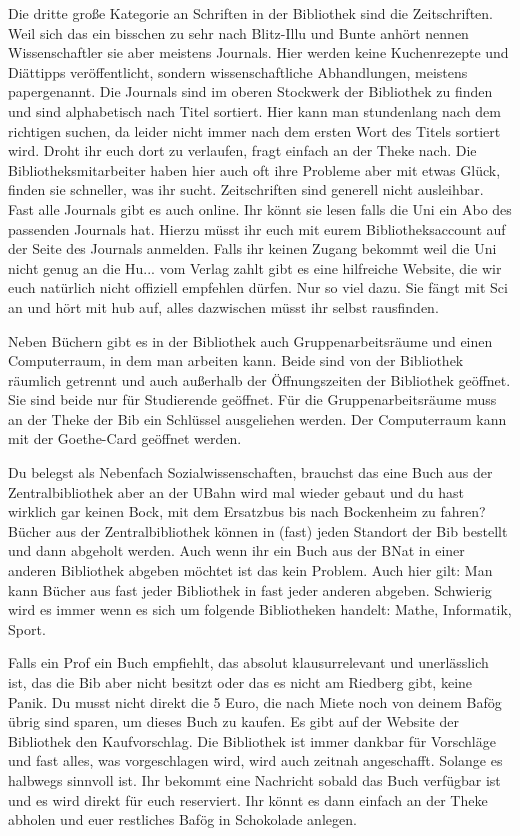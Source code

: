 Die dritte große Kategorie an Schriften in der Bibliothek sind die Zeitschriften. Weil sich das ein bisschen zu sehr nach Blitz-Illu und Bunte anhört nennen Wissenschaftler sie aber meistens Journals. Hier werden keine Kuchenrezepte und Diättipps veröffentlicht, sondern wissenschaftliche Abhandlungen, meistens \glqq paper\grqq genannt. Die Journals sind im oberen Stockwerk der Bibliothek zu finden und sind alphabetisch nach Titel sortiert. Hier kann man stundenlang nach dem richtigen suchen, da leider nicht immer nach dem ersten Wort des Titels sortiert wird. Droht ihr euch dort zu verlaufen, fragt einfach an der Theke nach. Die Bibliotheksmitarbeiter haben hier auch oft ihre Probleme aber mit etwas Glück, finden sie schneller, was ihr sucht. 
Zeitschriften sind generell nicht ausleihbar. Fast alle Journals gibt es auch online. Ihr könnt sie lesen falls die Uni ein Abo des passenden Journals hat. Hierzu müsst ihr euch mit eurem Bibliotheksaccount auf der Seite des Journals anmelden. Falls ihr keinen Zugang bekommt weil die Uni nicht genug an die Hu... vom Verlag zahlt gibt es eine hilfreiche Website, die wir euch natürlich nicht offiziell empfehlen dürfen. Nur so viel dazu. Sie fängt mit Sci an und hört mit hub auf, alles dazwischen müsst ihr selbst rausfinden.

Neben Büchern gibt es in der Bibliothek auch Gruppenarbeitsräume und einen Computerraum, in dem man arbeiten kann. Beide sind von der Bibliothek räumlich getrennt und auch außerhalb der Öffnungszeiten der Bibliothek geöffnet. Sie sind beide nur für Studierende geöffnet. Für die Gruppenarbeitsräume muss an der Theke der Bib ein Schlüssel ausgeliehen werden. Der Computerraum kann mit der Goethe-Card geöffnet werden.

Du belegst als Nebenfach Sozialwissenschaften, brauchst das eine Buch aus der Zentralbibliothek aber an der UBahn wird mal wieder gebaut und du hast wirklich gar keinen Bock, mit dem Ersatzbus bis nach Bockenheim zu fahren? Bücher aus der Zentralbibliothek können in (fast) jeden Standort der Bib bestellt und dann abgeholt werden. Auch wenn ihr ein Buch aus der BNat in einer anderen Bibliothek abgeben möchtet ist das kein Problem. Auch hier gilt: Man kann Bücher aus fast jeder Bibliothek in fast jeder anderen abgeben. Schwierig wird es immer wenn es sich um folgende Bibliotheken handelt: Mathe, Informatik, Sport.

Falls ein Prof ein Buch empfiehlt, das absolut klausurrelevant und unerlässlich ist, das die Bib aber nicht besitzt oder das es nicht am Riedberg gibt, keine Panik. Du musst nicht direkt die 5 Euro, die nach Miete noch von deinem Bafög übrig sind sparen, um dieses Buch zu kaufen. Es gibt auf der Website der Bibliothek den Kaufvorschlag. Die Bibliothek ist immer dankbar für Vorschläge und fast alles, was vorgeschlagen wird, wird auch zeitnah angeschafft. Solange es halbwegs sinnvoll ist. Ihr bekommt eine Nachricht sobald das Buch verfügbar ist und es wird direkt für euch reserviert. Ihr könnt es dann einfach an der Theke abholen und euer restliches Bafög in Schokolade anlegen.


